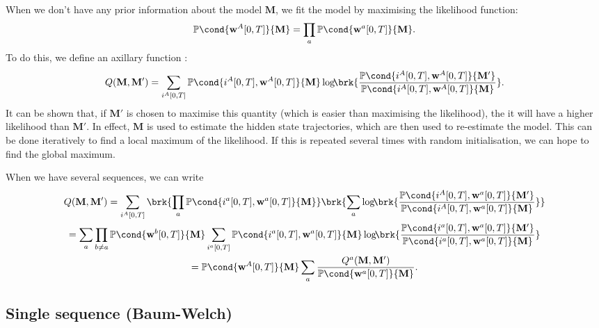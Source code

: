 \documentclass[12pt]{article}
\newcommand{\w}{\mathbf{w}}
\newcommand{\M}{\mathbf{M}}
\newcommand{\pr}{\mathbb{P}}
\begin{document}
When we don't have any prior information about the model $\M$, we fit the model by maximising the likelihood function:
%
\begin{equation}\label{eq:like}
  \pr\cond{\w^A[0,T]}{\M} = \prod_a \pr\cond{\w^a[0,T]}{\M}.
\end{equation}
%
To do this, we define an axillary function \cite{Baum1970baumwelch,Dempster2007EM}:
%
\begin{equation}\label{eq:emq}
  Q(\M,\M') = \sum_{i^A[0,T]} \pr\cond{i^A[0,T],\w^A[0,T]}{\M} \log\!\! \brk{
      \frac{ \pr\cond{i^A[0,T],\w^A[0,T]}{\M'} }{ \pr\cond{i^A[0,T],\w^A[0,T]}{\M} } }.
\end{equation}
%
It can be shown that, if $\M'$ is chosen to maximise this quantity (which is easier than maximising the likelihood), the it will have a higher likelihood than $\M'$.
In effect, $\M$ is used to estimate the hidden state trajectories, which are then used to re-estimate the model.
This can be done iteratively to find a local maximum of the likelihood.
If this is repeated several times with random initialisation, we can hope to find the global maximum.

When we have several sequences, we can write
%
\begin{multline}\label{eq:emqseveral}
  Q(\M,\M') = \sum_{i^A[0,T]} \brk{ \prod_a \pr\cond{i^a[0,T],\w^a[0,T]}{\M} } \brk{\sum_a  \log\!\!  \brk{
      \frac{ \pr\cond{i^A[0,T],\w^a[0,T]}{\M'} }{ \pr\cond{i^A[0,T],\w^a[0,T]}{\M} } } }\\
   = \sum_a \prod_{b \neq a} \pr\cond{\w^b[0,T]}{\M} \sum_{i^a[0,T]} \pr\cond{i^a[0,T],\w^a[0,T]}{\M} \log\!\!  \brk{
      \frac{ \pr\cond{i^a[0,T],\w^a[0,T]}{\M'} }{ \pr\cond{i^a[0,T],\w^a[0,T]}{\M} } } \\
   = \pr\cond{\w^A[0,T]}{\M} \sum_a \frac{Q^a(\M,\M')}{\pr\cond{\w^a[0,T]}{\M}}.
\end{multline}
%

\subsection{Single sequence (Baum-Welch) \label{sec:bw}}
\end{document}
